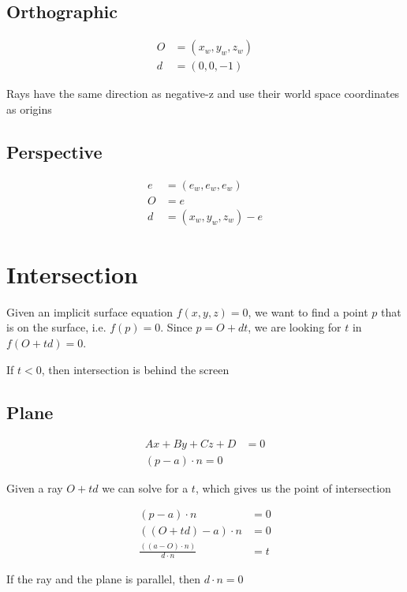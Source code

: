   \subsection{Orthographic}

    \begin{align}
      O &= \left( x_{w}, y_{w}, z_{w} \right) \\
      d &= \left( 0, 0, -1 \right)
    \end{align}

    Rays have the same direction as negative-z and use their world space
    coordinates as origins

  \subsection{Perspective}

    \begin{align}
      e &= \left( e_{w}, e_{w}, e_{w} \right) \\
      O &= e  \\
      d &= \left( x_{w}, y_{w}, z_{w} \right) - e
    \end{align}

\section{Intersection}

  Given an implicit surface equation $ f\left( x, y, z \right) = 0 $, we
  want to find a point $ p $ that is on the surface,
  i.e. $ f\left( p \right) = 0 $. Since $ p = O + dt $, we are looking for
  $ t $ in $ f\left( O + td \right) = 0 $.

  If $ t < 0 $, then intersection is behind the screen

  \subsection{Plane}

    \begin{align}
      Ax + By + Cz + D &= 0 \\
      \left( p - a \right) \cdot n = 0
    \end{align}

    Given a ray $ O + td $ we can solve for a $ t $, which gives us the
    point of intersection

    \begin{align*}
      \left( p - a \right) \cdot n &= 0 \\
      \left( \left( O + td \right) - a \right) \cdot n &= 0 \\
      \frac{\left( \left( a - O \right) \cdot n \right)}{d \cdot n} &= t
    \end{align*}

    If the ray and the plane is parallel, then $ d \cdot n = 0 $
